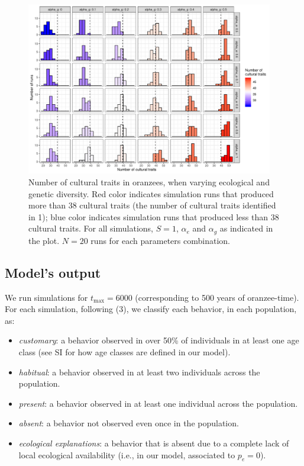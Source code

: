 \documentclass[9pt,twocolumn,twoside,]{pnas-new}
\begin{document}
\begin{figure}[h!]
\begin{center}
\includegraphics[width=10.8cm]{figures/figure_1.pdf}
\caption{Number of cultural traits in oranzees, when varying ecological and genetic diversity. Red color indicates simulation runs that produced more than 38 cultural traits (the number of cultural traits identified in 1); blue color indicates simulation runs that produced less than 38 cultural traits. For all simulations, $S=1$, $\alpha_e$ and $\alpha_g$ as indicated in the plot. $N=20$ runs for each parameters combination.}
\label{Figure1}
\end{center}
\end{figure}

\subsection*{Model's output}\label{format}

We run simulations for \(t_\text{max}=6000\) (corresponding to 500 years
of oranzee-time). For each simulation, following (3), we classify each
behavior, in each population, as:

\begin{itemize}
\item
  \emph{customary}: a behavior observed in over 50\% of individuals in
  at least one age class (see SI for how age classes are defined in our
  model).
\item
  \emph{habitual}: a behavior observed in at least two individuals
  across the population.
\item
  \emph{present}: a behavior observed in at least one individual across
  the population.
\item
  \emph{absent}: a behavior not observed even once in the population.
\item
  \emph{ecological explanations}: a behavior that is absent due to a
  complete lack of local ecological availability (i.e., in our model,
  associated to \(p_e=0\)).
\end{itemize}
\end{document}
